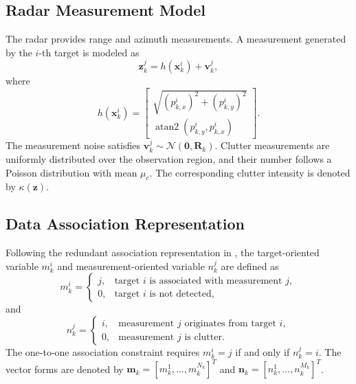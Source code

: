 \documentclass[10pt,doublecolumn]{IEEEtaes}
\begin{document}
\subsection{Radar Measurement Model}

The radar provides range and azimuth measurements. A measurement generated by the $i$-th target is modeled as
\begin{equation}
\mathbf{z}_{k}^{j}=h\!\left(\mathbf{x}_{k}^{i}\right)+\mathbf{v}_{k}^{j},
\label{eq:measurement_eq}
\end{equation}
where
\begin{equation}
h\!\left(\mathbf{x}_{k}^{i}\right)=
\begin{bmatrix}
\sqrt{(p_{k,x}^{i})^{2}+(p_{k,y}^{i})^{2}}\\
\operatorname{atan2}(p_{k,y}^{i},p_{k,x}^{i})
\end{bmatrix}.
\end{equation}
The measurement noise satisfies $\mathbf{v}_{k}^{j}\sim\mathcal{N}(\mathbf{0},\mathbf{R}_{k})$. Clutter measurements are uniformly distributed over the observation region, and their number follows a Poisson distribution with mean $\mu_c$. The corresponding clutter intensity is denoted by $\kappa(\mathbf{z})$.

\subsection{Data Association Representation}

Following the redundant association representation in \cite{williams2010convergence}, the target-oriented variable $m_k^i$ and measurement-oriented variable $n_k^j$ are defined as
\begin{equation}
m_k^i=
\begin{cases}
j, & \text{target }i\text{ is associated with measurement }j,\\
0, & \text{target }i\text{ is not detected},
\end{cases}
\end{equation}
and
\begin{equation}
n_k^j=
\begin{cases}
i, & \text{measurement }j\text{ originates from target }i,\\
0, & \text{measurement }j\text{ is clutter}.
\end{cases}
\end{equation}
The one-to-one association constraint requires $m_k^i=j$ if and only if $n_k^j=i$. The vector forms are denoted by $\mathbf{m}_k=[m_k^1,\ldots,m_k^{N_k}]^T$ and $\mathbf{n}_k=[n_k^1,\ldots,n_k^{M_k}]^T$.
\end{document}
